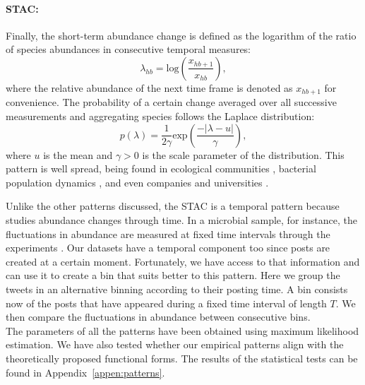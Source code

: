 \paragraph{STAC:} Finally, the short-term abundance change is defined as the logarithm of the ratio of species abundances in consecutive temporal measures:
\begin{equation}
    \lambda_{hb} = \textrm{log} \left( \frac{x_{h b+1}}{x_{hb}} \right),
\end{equation}
where the relative abundance of the next time frame is denoted as $x_{hb+1}$ for convenience. The probability of a certain change averaged over all successive measurements and aggregating species  follows the Laplace distribution: 
\begin{equation}
    p(\lambda) = \frac{1}{2\gamma} \textrm{exp} \left( \frac{- |\lambda - u|}{\gamma} \right),
\end{equation}
where $u$ is the mean and $\gamma > 0$ is the scale parameter of the distribution. This pattern is well spread, being found in ecological communities \cite{marquet2005scaling}, bacterial population dynamics \cite{ji2020macroecological}, and even companies and universities \cite{stanley1996scaling,plerou1999similarities}.

Unlike the other patterns discussed, the STAC is a temporal pattern because studies abundance changes through time. In a microbial sample, for instance, the fluctuations in abundance are measured at fixed time intervals through the experiments \cite{ji2020macroecological}. Our datasets have a temporal component too since posts are created at a certain moment. Fortunately, we have access to that information and can use it to create a bin that suits better to this pattern. Here we group the tweets in an alternative binning according to their posting time. A bin consists now of the posts that have appeared during a fixed time interval of length $T$.  We then compare the fluctuations in abundance between consecutive bins. \\ 

The parameters of all the patterns have been obtained using  maximum likelihood estimation. We have also tested whether our empirical patterns align with the theoretically proposed functional forms. The results of the statistical tests can be found in Appendix~\ref{appen:patterns}.

